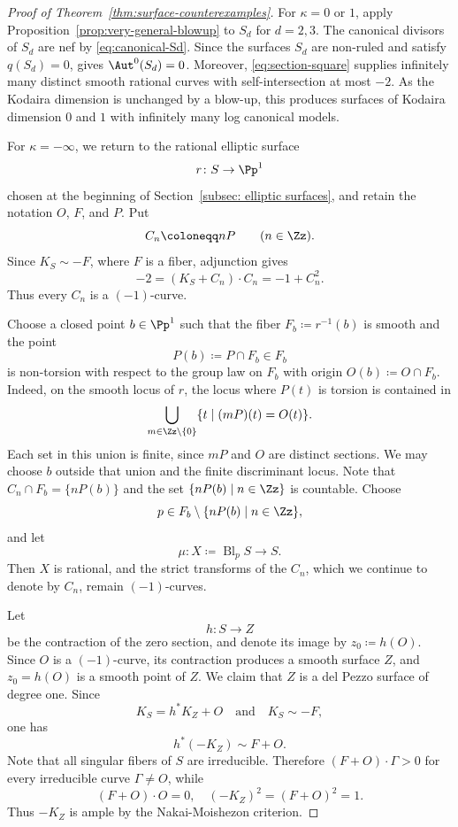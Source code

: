 \documentclass[12pt]{amsart}
\begin{document}
\begin{proof}[Proof of Theorem~\ref{thm:surface-counterexamples}]

For $\kappa=0$ or $1$, apply Proposition~\ref{prop:very-general-blowup} to $S_d$ for
$d=2,3$. The canonical divisors of $S_d$ are nef by
\eqref{eq:canonical-Sd}. Since the surfaces $S_d$ are non-ruled and
satisfy $q(S_d)=0$, \cite[Corollary~4.7]{Han87} gives
$\Aut^0(S_d)=0$. Moreover, \eqref{eq:section-square} supplies
infinitely many distinct smooth rational curves with
self-intersection at most $-2$. As the Kodaira dimension is unchanged by a blow-up, this produces surfaces of Kodaira dimension $0$ and $1$ with infinitely many log canonical models.

\medskip

For $\kappa=-\infty$, we return to the rational elliptic surface 
\[r\colon S\to\Pp^1\] chosen at the beginning of Section~\ref{subsec: elliptic surfaces}, and retain the notation $O$, $F$, and $P$. Put
\[
 C_n\coloneqq nP\qquad(n\in\Zz).
\]
Since $K_S\sim-F$, where $F$ is a fiber, adjunction gives
\[
 -2=(K_S+C_n)\cdot C_n=-1+C_n^2.
\]
Thus every $C_n$ is a $(-1)$-curve.

Choose a closed point $b\in\Pp^1$ such that the fiber $F_b\coloneqq r^{-1}(b)$ is smooth
and the point
\[
P(b)\coloneqq P\cap F_b\in F_b
\]
is non-torsion with respect to the group law on $F_b$ with origin
$O(b)\coloneqq O\cap F_b$. Indeed, on the smooth locus of $r$, the locus where $P(t)$ is torsion is
contained in
\[
\bigcup_{m\in \Zz\backslash\{0\}}\{t\mid (mP)(t)=O(t)\}.
\]
Each set in this union is finite, since $mP$ and $O$ are distinct
sections. We may choose $b$ outside that union and the finite discriminant locus. Note that $C_n \cap F_b=\{nP(b)\}$ and the set $\{nP(b)\mid n\in\Zz\}$ is countable. Choose
\[
 p\in F_b\setminus\{nP(b)\mid n\in\Zz\},
\]
and let
\[
 \mu\colon X\coloneqq\operatorname{Bl}_pS\to S.
\]
Then $X$ is rational, and the strict transforms of the $C_n$, which we
continue to denote by $C_n$, remain $(-1)$-curves.

Let
\[
 h\colon S\to Z
\]
be the contraction of the zero section, and denote its image by $z_0\coloneqq h(O)$.
Since $O$ is a $(-1)$-curve, its contraction produces a smooth surface
$Z$, and $z_0=h(O)$ is a smooth point of $Z$. We claim that $Z$ is a del Pezzo surface of degree one. Since
\[
 K_S=h^*K_Z+O
 \quad\text{and}\quad
 K_S\sim-F,
\]
one has
\[
 h^*(-K_Z)\sim F+O.
\]
Note that all singular fibers of $S$ are irreducible. Therefore $(F+O)\cdot\Gamma>0$ for every irreducible curve $\Gamma\neq O$, while 
\begin{equation}\label{eq: intersections}
  (F+O)\cdot O=0,\quad (-K_Z)^2=(F+O)^2=1.
\end{equation} Thus $-K_Z$ is ample by the Nakai-Moishezon criterion.


\end{proof}
\end{document}
